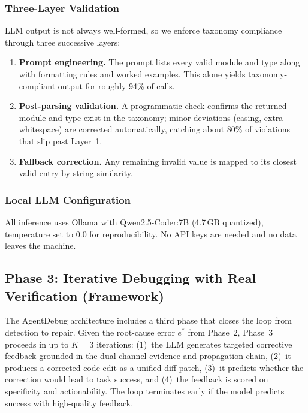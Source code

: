 \documentclass{ieeeaccess}
\begin{document}
\subsubsection{Three-Layer Validation}

LLM output is not always well-formed, so we enforce taxonomy compliance through three successive layers:

\begin{enumerate}
    \item \textbf{Prompt engineering.} The prompt lists every valid module and type along with formatting rules and worked examples. This alone yields taxonomy-compliant output for roughly 94\% of calls.
    \item \textbf{Post-parsing validation.} A programmatic check confirms the returned module and type exist in the taxonomy; minor deviations (casing, extra whitespace) are corrected automatically, catching about 80\% of violations that slip past Layer~1.
    \item \textbf{Fallback correction.} Any remaining invalid value is mapped to its closest valid entry by string similarity.
\end{enumerate}

\subsubsection{Local LLM Configuration}

All inference uses Ollama \cite{b11} with Qwen2.5-Coder:7B \cite{b12} (4.7\,GB quantized), temperature set to 0.0 for reproducibility. No API keys are needed and no data leaves the machine.


\subsection{Phase 3: Iterative Debugging with Real Verification (Framework)}
\label{sec:phase3}

The AgentDebug architecture includes a third phase that closes the loop from detection to repair. Given the root-cause error $e^*$ from Phase~2, Phase~3 proceeds in up to $K=3$ iterations: (1)~the LLM generates targeted corrective feedback grounded in the dual-channel evidence and propagation chain, (2)~it produces a corrected code edit as a unified-diff patch, (3)~it predicts whether the correction would lead to task success, and (4)~the feedback is scored on specificity and actionability. The loop terminates early if the model predicts success with high-quality feedback.
\end{document}
